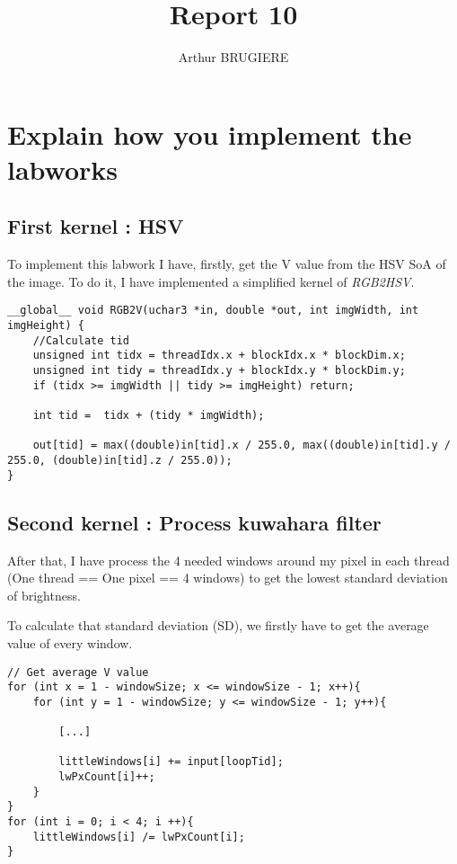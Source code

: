 \documentclass[11pt]{article} %
\title{Report 10}
\author{Arthur BRUGIERE}
\begin{document}
\maketitle

\section{Explain how you implement the labworks}

\subsection{First kernel : HSV}

To implement this labwork I have, firstly, get the V value from the HSV SoA of the image. To do it, I have implemented a simplified kernel of {\it RGB2HSV}.

\begin{lstlisting}[style=CStyle]
__global__ void RGB2V(uchar3 *in, double *out, int imgWidth, int imgHeight) {
    //Calculate tid
    unsigned int tidx = threadIdx.x + blockIdx.x * blockDim.x;
    unsigned int tidy = threadIdx.y + blockIdx.y * blockDim.y;
    if (tidx >= imgWidth || tidy >= imgHeight) return;
    
    int tid =  tidx + (tidy * imgWidth);
    
    out[tid] = max((double)in[tid].x / 255.0, max((double)in[tid].y / 255.0, (double)in[tid].z / 255.0));
}
\end{lstlisting}

\subsection{Second kernel : Process kuwahara filter}

After that, I have process the 4 needed windows around my pixel in each thread (One thread == One pixel == 4 windows) to get the lowest standard deviation of brightness.

To calculate that standard deviation (SD), we firstly have to get the average value of every window. 

\begin{lstlisting}[style=CStyle]
// Get average V value
for (int x = 1 - windowSize; x <= windowSize - 1; x++){
	for (int y = 1 - windowSize; y <= windowSize - 1; y++){
		
		[...]

		littleWindows[i] += input[loopTid];
		lwPxCount[i]++;
	}
}
for (int i = 0; i < 4; i ++){
    littleWindows[i] /= lwPxCount[i];
}
\end{lstlisting}
\end{document}
